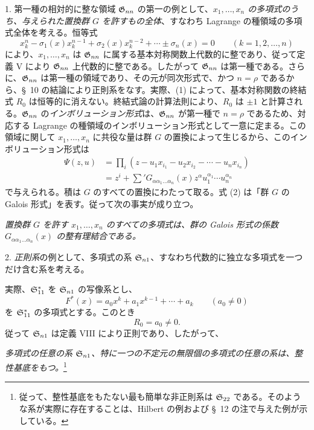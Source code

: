 \documentclass[11pt]{article}
\begin{document}
1. 第一種の相対的に整な領域 $\mathfrak{G}_{nn}$ の第一の例として、\emph{$x_1,\ldots,x_n$ の多項式のうち、与えられた置換群 $G$ を許すもの全体}、すなわち Lagrange の種領域の多項式全体を考える。恒等式
\begin{equation}
  x_k^n-\sigma_1(x)x_k^{n-1}+\sigma_2(x)x_k^{n-2}+\cdots\pm\sigma_n(x)=0
  \qquad(k=1,2,
\ldots,n)
\tag{1}
\end{equation}
により、$x_1,\ldots,x_n$ は $\mathfrak{G}_{nn}$ に属する基本対称関数上代数的に整であり、従って定義 V により $\mathfrak{G}_{nn}$ 上代数的に整である。したがって $\mathfrak{G}_{nn}$ は第一種である。さらに、$\mathfrak{G}_{nn}$ は第一種の領域であり、その元が同次形式で、かつ $n=\rho$ であるから、\S\ 10 の結論により正則系をなす。実際、(1) によって、基本対称関数の終結式 $R_0$ は恒等的に消えない。終結式論の計算法則により、$R_0$ は $\pm1$ と計算される。$\mathfrak{G}_{nn}$ の\emph{インボリューション形式}は、$\mathfrak{G}_{nn}$ が第一種で $n=\rho$ であるため、対応する Lagrange の種領域のインボリューション形式として一意に定まる。この領域に関して $x_1,\ldots,x_n$ に共役な量は群 $G$ の置換によって生じるから、このインボリューション形式は
\begin{equation}
\begin{aligned}
  \Psi(z,u)&=\prod_i
  (z-u_1x_{i_1}-u_2x_{i_2}-\cdots-u_nx_{i_n})\\
  &=z^i+\sum{}'G_{\alpha\alpha_1\ldots\alpha_n}(x)
  z^\alpha u_1^{\alpha_1}\cdots u_n^{\alpha_n}
\end{aligned}
\tag{2}
\end{equation}
で与えられる。積は $G$ のすべての置換にわたって取る。式 (2) は「群 $G$ の Galois 形式」を表す。従って次の事実が成り立つ。

\emph{置換群 $G$ を許す $x_1,\ldots,x_n$ のすべての多項式は、群の Galois 形式の係数 $G_{\alpha\alpha_1\ldots\alpha_n}(x)$ の整有理結合である。}

2. \emph{正則系}の例として、多項式の系 $\mathfrak{S}_{n1}$、すなわち代数的に独立な多項式を一つだけ含む系を考える。

実際、$\mathfrak{S}^*_{11}$ を $\mathfrak{S}_{n1}$ の写像系とし、
\[
  F^*(x)=a_0x^k+a_1x^{k-1}+\cdots+a_k\qquad(a_0\ne0)
\]
を $\mathfrak{S}^*_{11}$ の多項式とする。このとき
\begin{equation}
  R_0=a_0\ne0.
\tag{3}
\end{equation}
従って $\mathfrak{S}_{n1}$ は定義 VIII により正則であり、したがって、

\emph{多項式の任意の系 $\mathfrak{S}_{n1}$、特に一つの不定元の無限個の多項式の任意の系は、整性基底をもつ。}\footnote{従って、整性基底をもたない最も簡単な非正則系は $\mathfrak{S}_{22}$ である。そのような系が実際に存在することは、Hilbert の例および \S\ 12 の注で与えた例が示している。}
\end{document}
